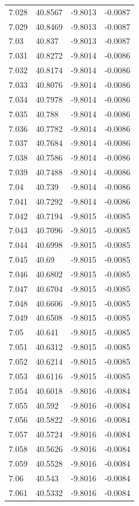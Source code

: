 \begin{tabular}{llll}
7.028 & 40.8567 & -9.8013 & -0.0087 \\
7.029 & 40.8469 & -9.8013 & -0.0087 \\
7.03 & 40.837 & -9.8013 & -0.0087 \\
7.031 & 40.8272 & -9.8014 & -0.0086 \\
7.032 & 40.8174 & -9.8014 & -0.0086 \\
7.033 & 40.8076 & -9.8014 & -0.0086 \\
7.034 & 40.7978 & -9.8014 & -0.0086 \\
7.035 & 40.788 & -9.8014 & -0.0086 \\
7.036 & 40.7782 & -9.8014 & -0.0086 \\
7.037 & 40.7684 & -9.8014 & -0.0086 \\
7.038 & 40.7586 & -9.8014 & -0.0086 \\
7.039 & 40.7488 & -9.8014 & -0.0086 \\
7.04 & 40.739 & -9.8014 & -0.0086 \\
7.041 & 40.7292 & -9.8014 & -0.0086 \\
7.042 & 40.7194 & -9.8015 & -0.0085 \\
7.043 & 40.7096 & -9.8015 & -0.0085 \\
7.044 & 40.6998 & -9.8015 & -0.0085 \\
7.045 & 40.69 & -9.8015 & -0.0085 \\
7.046 & 40.6802 & -9.8015 & -0.0085 \\
7.047 & 40.6704 & -9.8015 & -0.0085 \\
7.048 & 40.6606 & -9.8015 & -0.0085 \\
7.049 & 40.6508 & -9.8015 & -0.0085 \\
7.05 & 40.641 & -9.8015 & -0.0085 \\
7.051 & 40.6312 & -9.8015 & -0.0085 \\
7.052 & 40.6214 & -9.8015 & -0.0085 \\
7.053 & 40.6116 & -9.8015 & -0.0085 \\
7.054 & 40.6018 & -9.8016 & -0.0084 \\
7.055 & 40.592 & -9.8016 & -0.0084 \\
7.056 & 40.5822 & -9.8016 & -0.0084 \\
7.057 & 40.5724 & -9.8016 & -0.0084 \\
7.058 & 40.5626 & -9.8016 & -0.0084 \\
7.059 & 40.5528 & -9.8016 & -0.0084 \\
7.06 & 40.543 & -9.8016 & -0.0084 \\
7.061 & 40.5332 & -9.8016 & -0.0084 \\

\end{tabular}
